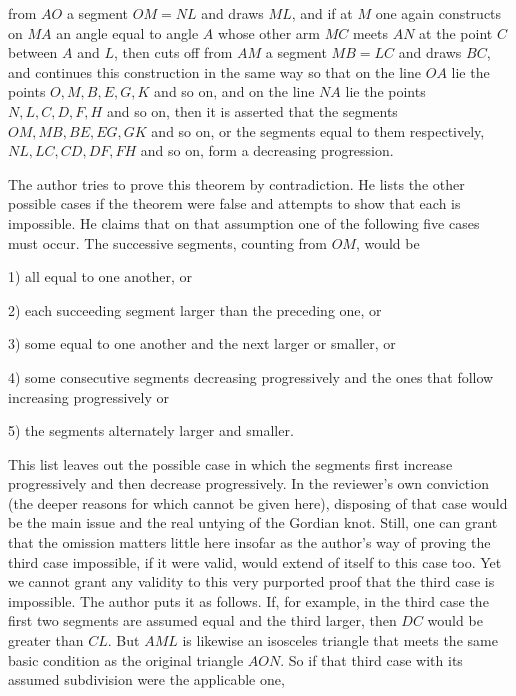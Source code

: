 %
from \(AO\) a segment \(OM=NL\) and draws \(ML\), and if at \(M\) one again constructs on \(MA\) an angle equal to angle \(A\) whose other arm \(MC\) meets \(AN\) at the point \(C\) between \(A\) and \(L\), then cuts off from \(AM\) a segment \(MB=LC\) and draws \(BC\), and continues this construction in the same way so that on the line \(OA\) lie the points \(O,M,B,E,G,K\) and so on, and on the line \(NA\) lie the points \(N,L,C,D,F,H\) and so on, then it is asserted that the segments \(OM,MB,BE,EG,GK\) and so on, or the segments equal to them respectively, \(NL,LC,CD,DF,FH\) and so on, form a decreasing progression.

The author tries to prove this theorem by contradiction. He lists the other possible cases if the theorem were false and attempts to show that each is impossible. He claims that on that assumption one of the following five cases must occur. The successive segments, counting from \(OM\), would be
\par\noindent\hspace*{\parindent}1) all equal to one another, or
\par\noindent\hspace*{\parindent}2) each succeeding segment larger than the preceding one, or
\par\noindent\hspace*{\parindent}3) some equal to one another and the next larger or smaller, or
\par\noindent\hspace*{\parindent}4) some consecutive segments decreasing progressively and the ones that follow increasing progressively or
\par\noindent\hspace*{\parindent}5) the segments alternately larger and smaller.
\par\noindent This list leaves out the possible case in which the segments first increase progressively and then decrease progressively. In the reviewer's own conviction (the deeper reasons for which cannot be given here), disposing of that case would be the main issue and the real untying of the Gordian knot. Still, one can grant that the omission matters little here insofar as the author's way of proving the third case impossible, if it were valid, would extend of itself to this case too. Yet we cannot grant any validity to this very purported proof that the third case is impossible. The author puts it as follows. If, for example, in the third case the first two segments are assumed equal and the third larger, then \(DC\) would be greater than \(CL\). But \(AML\) is likewise an isosceles triangle that meets the same basic condition as the original triangle \(AON\). So if that third case with its assumed subdivision were the applicable one,
